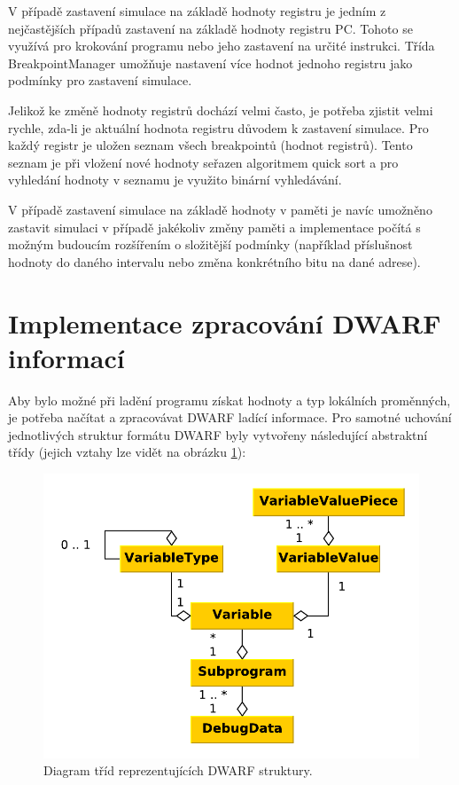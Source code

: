 V případě zastavení simulace na základě hodnoty registru je jedním z nejčastějších případů zastavení na základě hodnoty registru PC. Tohoto se využívá pro krokování programu nebo jeho zastavení na určité instrukci. Třída BreakpointManager umožňuje nastavení více hodnot jednoho registru jako podmínky pro zastavení simulace. 

Jelikož ke změně hodnoty registrů dochází velmi často, je potřeba zjistit velmi rychle, zda-li je aktuální hodnota registru důvodem k zastavení simulace. Pro každý registr je uložen seznam všech breakpointů (hodnot registrů). Tento seznam je při vložení nové hodnoty seřazen algoritmem quick sort a pro vyhledání hodnoty v seznamu je využito binární vyhledávání.

V případě zastavení simulace na základě hodnoty v paměti je navíc umožněno zastavit simulaci v případě jakékoliv změny paměti a implementace počítá s možným budoucím rozšířením o složitější podmínky (například příslušnost hodnoty do daného intervalu nebo změna konkrétního bitu na dané adrese).

\section{Implementace zpracování DWARF informací}
\label{label_dwarf}

Aby bylo možné při ladění programu získat hodnoty a typ lokálních proměnných, je potřeba načítat a zpracovávat DWARF ladící informace. Pro samotné uchování jednotlivých struktur formátu DWARF byly vytvořeny následující abstraktní třídy (jejich vztahy lze vidět na obrázku \ref{fig:dwarf_classes}):

\begin{figure}[h]
\centering
\includegraphics[trim=0cm 0cm 0cm 0cm, scale=0.7]{fig/dwarf_impl}
\caption{Diagram tříd reprezentujících DWARF struktury.}
\label{fig:dwarf_classes}
\end{figure}

